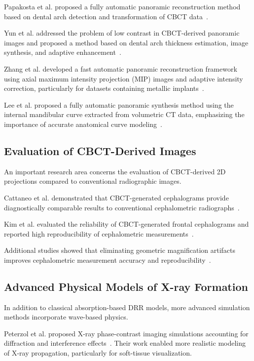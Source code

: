 \documentclass[11pt,a4paper]{article}
\begin{document}
Papakosta et al. proposed a fully automatic panoramic reconstruction method based on dental arch detection and transformation of CBCT data~\cite{Papakosta2017}.

Yun et al. addressed the problem of low contrast in CBCT-derived panoramic images and proposed a method based on dental arch thickness estimation, image synthesis, and adaptive enhancement~\cite{YUN2019205}.

Zhang et al. developed a fast automatic panoramic reconstruction framework using axial maximum intensity projection (MIP) images and adaptive intensity correction, particularly for datasets containing metallic implants~\cite{electronics11152404}.

Lee et al. proposed a fully automatic panoramic synthesis method using the internal mandibular curve extracted from volumetric CT data, emphasizing the importance of accurate anatomical curve modeling~\cite{DBLP:conf/cimaging/LeeWLLS19}.

\subsection{Evaluation of CBCT-Derived Images}

An important research area concerns the evaluation of CBCT-derived 2D projections compared to conventional radiographic images.

Cattaneo et al. demonstrated that CBCT-generated cephalograms provide diagnostically comparable results to conventional cephalometric radiographs~\cite{Cattaneo2008}.

Kim et al. evaluated the reliability of CBCT-generated frontal cephalograms and reported high reproducibility of cephalometric measurements~\cite{Kim2012}.

Additional studies showed that eliminating geometric magnification artifacts improves cephalometric measurement accuracy and reproducibility~\cite{diagnostics11122292}.

\subsection{Advanced Physical Models of X-ray Formation}

In addition to classical absorption-based DRR models, more advanced simulation methods incorporate wave-based physics.

Peterzol et al. proposed X-ray phase-contrast imaging simulations accounting for diffraction and interference effects~\cite{Peterzol2007}. Their work enabled more realistic modeling of X-ray propagation, particularly for soft-tissue visualization.
\end{document}
